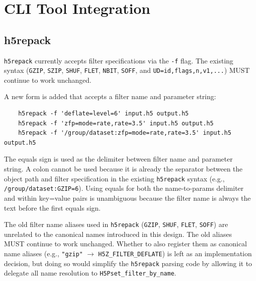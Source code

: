 \documentclass[../HDF5_RFC.tex]{subfiles}
\begin{document}
\section{CLI Tool Integration}
\label{sec:cli-tools}

\subsection{h5repack}

\texttt{h5repack} currently accepts filter specifications via the \texttt{-f} flag. The
existing syntax (\texttt{GZIP}, \texttt{SZIP}, \texttt{SHUF}, \texttt{FLET}, \texttt{NBIT},
\texttt{SOFF}, and \texttt{UD=id,flags,n,v1,...}) MUST continue to work unchanged.

A new form is added that accepts a filter name and parameter string:

\begin{verbatim}
    h5repack -f 'deflate=level=6' input.h5 output.h5
    h5repack -f 'zfp=mode=rate,rate=3.5' input.h5 output.h5
    h5repack -f '/group/dataset:zfp=mode=rate,rate=3.5' input.h5 output.h5
\end{verbatim}

The equals sign is used as the delimiter between filter name and parameter
string. A colon cannot be used because it is already the separator between the
object path and filter specification in the existing \texttt{h5repack} syntax (e.g.,
\texttt{/group/dataset:GZIP=6}). Using equals for both the name-to-params delimiter
and within key=value pairs is unambiguous because the filter name is always
the text before the first equals sign.

The old filter name aliases used in \texttt{h5repack} (\texttt{GZIP}, \texttt{SHUF},
\texttt{FLET}, \texttt{SOFF}) are unrelated to the canonical names introduced in this
design. The old aliases MUST continue to work unchanged. Whether to also
register them as canonical name aliases (e.g., \texttt{"gzip"} $\rightarrow$
\texttt{H5Z\_FILTER\_DEFLATE}) is left as an implementation decision, but doing so
would simplify the \texttt{h5repack} parsing code by allowing it to delegate all
name resolution to \texttt{H5Pset\_filter\_by\_name}.

\label{sec:ud-disambiguation}
\end{document}
